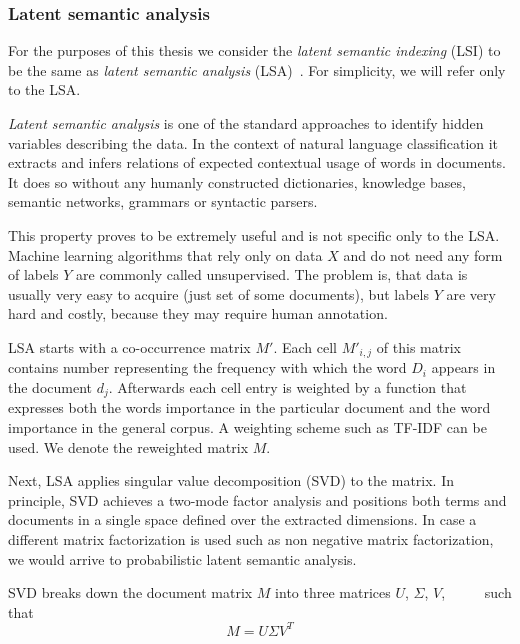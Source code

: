     \subsubsection{Latent semantic analysis} \label{sec:lsa}
    
    For the purposes of this thesis we consider the \emph{latent semantic indexing} (LSI) to be the same as \emph{latent semantic analysis} (LSA)~\cite{deerwester1990indexing}.
    For simplicity, we will refer only to the LSA.
    
    \emph{Latent semantic analysis} is one of the standard approaches to identify hidden variables describing the data.
    In the context of natural language classification it extracts and infers relations of expected contextual usage of words in documents.
    It does so without any humanly constructed dictionaries, knowledge bases, semantic networks, grammars or syntactic parsers.
    
    This property proves to be extremely useful and is not specific only to the LSA.
    Machine learning algorithms that rely only on data $X$ and do not need any form of labels $Y$ are commonly called unsupervised.
    The problem is, that data is usually very easy to acquire (just set of some documents), but labels $Y$ are very hard and costly, because they may require human annotation.
    
    LSA starts with a co-occurrence matrix $M'$. 
    Each cell $M'_{i,j}$ of this matrix contains number representing the frequency with which  the  word $D_i$ appears in the document $d_j$.
    Afterwards each cell entry is weighted by a function that expresses both the words importance in the particular document and the word importance in the general corpus.
    A weighting scheme such as TF-IDF can be used.
    We denote the reweighted matrix $M$. 
    
    Next, LSA applies singular value decomposition (SVD) to the matrix.
    In principle, SVD achieves a two-mode factor analysis and positions both terms and documents in a single space defined over the extracted dimensions.
    In case a different matrix factorization is used such as non negative matrix factorization, we would arrive to probabilistic latent semantic analysis.
    
    SVD breaks down the document matrix $M$ into three matrices $U$, $\Sigma$, $V$,\cite{papadimitriou2000latent} %
   ~\cite{maas2011learning} %
   ~\cite{wiemer2004latent} %
   ~\cite{landauer1998introduction} %
    such that $$M=U \Sigma V^T$$ 

